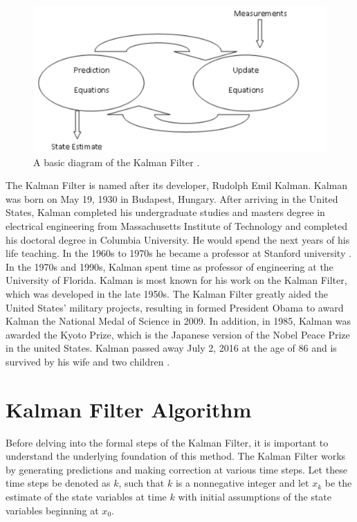 \newpage

\begin{figure}[h]
    \centering
    \includegraphics[scale = 0.3]{diagram.png}
    \caption{A basic diagram of the Kalman Filter \cite{kohanbash_2014}.}
    \label{coffee}
\end{figure}

\newpage

\noindent The Kalman Filter is named after its developer, Rudolph Emil Kalman. Kalman was born on May 19, 1930 in Budapest, Hungary. After arriving in the United States, Kalman completed his undergraduate studies and masters degree in electrical engineering from Massachusetts Institute of Technology  and completed his doctoral degree in Columbia University. He would spend the next years of his life teaching. In the 1960s to 1970s he became a professor at Stanford university \cite{kalmanbio}. In the 1970s and 1990s, Kalman spent time as professor of  engineering at the University of Florida. Kalman is most known for his work on the Kalman Filter, which was developed in the late 1950s. The Kalman Filter greatly aided the United States' military projects, resulting in formed President Obama to award Kalman the National Medal of Science in 2009. In addition, in 1985, Kalman was awarded the Kyoto Prize, which is the Japanese version of the Nobel Peace Prize in the united States. Kalman passed away July 2, 2016 at the age of 86 and is survived by his wife and two children \cite{Kalman_bio}. 


\newpage

\section{Kalman Filter Algorithm}

Before  delving into the formal steps of the Kalman Filter, it is important to understand the underlying foundation of this method. The Kalman Filter works by generating predictions and making correction at various time steps. Let these time steps be denoted as $k$, such that $ k $ is a nonnegative integer and let $x_k$ be the estimate of the state variables at time $k$ with initial assumptions of the state variables beginning at $x_0$. 

